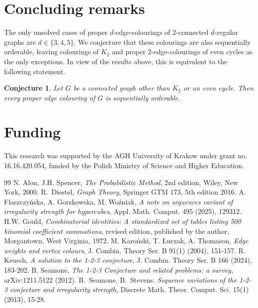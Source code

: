 \documentclass[a4paper,12pt]{elsarticle}
\newtheorem{conjecture}[theorem]{Conjecture}
\begin{document}
\section{Concluding remarks}

The only unsolved cases of proper $d$-edge-colourings of 2-connected $d$-regular graphs are $d\in\{3,4,5\}$. We conjecture that these colourings are also sequentially orderable, leaving colourings of $K_2$ and proper 2-edge-colourings of even cycles as the only exceptions. In view of the results above, this is equivalent to the following statement.

\begin{conjecture}
Let $G$ be a connected graph other than $K_2$ or an even cycle. Then every proper edge colouring of $G$ is sequentially orderable.
\end{conjecture}

\section*{Funding}
This research was supported by the AGH University of Krakow under grant no. 16.16.420.054, funded by the Polish Ministry of Science and Higher Education.

\begin{thebibliography}{99}
N. Alon, J.H. Spencer, \emph{The Probabilistic Method}, 2nd edition, Wiley, New York, 2000.
R.~Diestel, \emph{Graph Theory}, 
Springer GTM 173, 5th edition 2016.
A. Flaszczyńska, A. Gorzkowska, M. Woźniak, \emph{A note on sequences variant of irregularity strength for hypercubes}, Appl. Math. Comput. 495 (2025), 129312.
H.W. Gould, \emph{Combinatorial identities: A standardized set of tables listing 500 binomial coefficient summations}, revised edition, published by the author, Morgantown, West Virginia, 1972.
M. Karoński, T. Łuczak, A. Thomason, \emph{Edge weights and vertex colours}, J. Combin. Theory Ser. B 91(1) (2004), 151-157.
R. Keusch, \emph{A solution to the 1-2-3 conjecture}, J. Combin. Theory Ser. B 166 (2024), 183-202.
B. Seamone, \emph{The 1-2-3 Conjecture and related problems: a survey}, arXiv:1211.5122 (2012).
B.~Seamone, B.~Stevens. \emph{Sequence variations of the 1-2-3 conjecture and irregularity strength}, Discrete Math. Theor. Comput. Sci. 15(1) (2013), 15-28.

\end{thebibliography}
\end{document}

